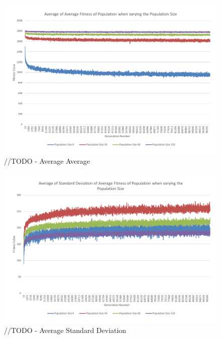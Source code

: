 \begin{figure}
	\centerline{\includegraphics[width=\paperwidth]{figures/CircleTests/CircleTestsPopulationAverageAverage.pdf}}
	\caption{//TODO - Average Average}
\end{figure}

\begin{figure}
	\centerline{\includegraphics[width=\paperwidth]{figures/CircleTests/CircleTestsPopulationAverageStandardDeviation.pdf}}
	\caption{//TODO - Average Standard Deviation}
\end{figure}

